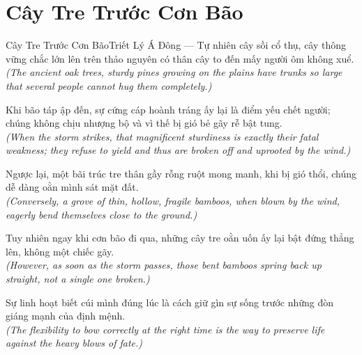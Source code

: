 \section{Cây Tre Trước Cơn Bão}
\begin{truyen}{Cây Tre Trước Cơn Bão}{Triết Lý Á Đông --- Tự nhiên}
 cây sồi cổ thụ, cây thông vững chắc lớn lên trên thảo nguyên có thân cây to đến mấy người ôm không xuể.\\[4pt]
\textit{(The ancient oak trees, sturdy pines growing on the plains have trunks so large that several people cannot hug them completely.)}

Khi bão táp ập đến, sự cứng cáp hoành tráng ấy lại là điểm yếu chết người; chúng không chịu nhượng bộ và vì thế bị gió bẻ gãy rễ bật tung.\\[4pt]
\textit{(When the storm strikes, that magnificent sturdiness is exactly their fatal weakness; they refuse to yield and thus are broken off and uprooted by the wind.)}

Ngược lại, một bãi trúc tre thân gầy rỗng ruột mong manh, khi bị gió thổi, chúng dễ dàng oằn mình sát mặt đất.\\[4pt]
\textit{(Conversely, a grove of thin, hollow, fragile bamboos, when blown by the wind, eagerly bend themselves close to the ground.)}

Tuy nhiên ngay khi cơn bão đi qua, những cây tre oằn uốn ấy lại bật đứng thẳng lên, không một chiếc gãy.\\[4pt]
\textit{(However, as soon as the storm passes, those bent bamboos spring back up straight, not a single one broken.)}

\end{truyen}
\begin{baihoc}
  Sự linh hoạt biết cúi mình đúng lúc là cách giữ gìn sự sống trước những đòn giáng mạnh của định mệnh.\\[4pt]
  \textit{(The flexibility to bow correctly at the right time is the way to preserve life against the heavy blows of fate.)}
\end{baihoc}


